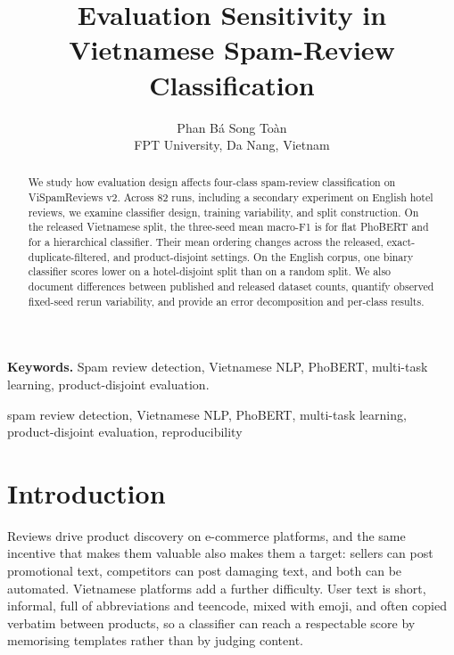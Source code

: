 \documentclass[12pt,a4paper]{article}
\begin{document}
\title{Evaluation Sensitivity in Vietnamese Spam-Review Classification}

\ifdefined\JCCSubmission
\author{Phan Bá Song Toàn\\
\small FPT University, Da Nang, Vietnam%
\ifdefined\JCCCorrespondence\\\small \JCCCorrespondence\fi}
\date{}
\else
\author{
}
\fi

\maketitle

\begin{abstract}
We study how evaluation design affects four-class spam-review classification on ViSpamReviews v2. Across 82 runs, including a secondary experiment on English hotel reviews, we examine classifier design, training variability, and split construction. On the released Vietnamese split, the three-seed mean macro-F1 is \SingleFone{} for flat PhoBERT and \MultiFone{} for a hierarchical classifier. Their mean ordering changes across the released, exact-duplicate-filtered, and product-disjoint settings. On the English corpus, one binary classifier scores lower on a hotel-disjoint split than on a random split. We also document differences between published and released dataset counts, quantify observed fixed-seed rerun variability, and provide an error decomposition and per-class results.
\end{abstract}

\ifdefined\JCCSubmission
\noindent\textbf{Keywords.} Spam review detection, Vietnamese NLP, PhoBERT, multi-task learning, product-disjoint evaluation.
\else
\begin{IEEEkeywords}
spam review detection, Vietnamese NLP, PhoBERT, multi-task learning, product-disjoint evaluation, reproducibility
\end{IEEEkeywords}
\fi

\section{Introduction}
Reviews drive product discovery on e-commerce platforms, and the same incentive that makes them valuable also makes them a target: sellers can post promotional text, competitors can post damaging text, and both can be automated. Vietnamese platforms add a further difficulty. User text is short, informal, full of abbreviations and teencode, mixed with emoji, and often copied verbatim between products, so a classifier can reach a respectable score by memorising templates rather than by judging content.
\end{document}
